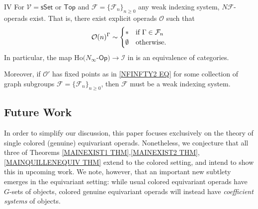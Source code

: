 \documentclass[a4paper,10pt
,draft
]{article}%
\numberwithin{equation}{section}
\numberwithin{figure}{section}
\theoremstyle{definition} %
\newcommand{\Set}{\ensuremath{\mathsf{Set}}}
\newcommand{\sSet}{\ensuremath{\mathsf{sSet}}}%
\newcommand{\Op}{\mathsf{Op}}%
\newcommand{\V}{\ensuremath{\mathcal V}}
\renewcommand{\O}{\ensuremath{\mathcal O}}
\newcommand{\1}{\ensuremath{\mathbbm 1}}%
\begin{document}
\begin{customcor}{IV}\label{NINFTY_REAL_COR_MAIN}
For $\V = \sSet$ or $\mathsf{Top}$ and 
$\mathcal{F} = \{\mathcal{F}_n\}_{n \geq 0}$
any weak indexing system,
$N \mathcal{F}$-operads exist. That is, there exist explicit operads $\O$
such that
\begin{equation}\label{NFINFTY2 EQ}
	\O(n)^{\Gamma} \sim 
\begin{cases}
	\** & \text{if } \Gamma \in \mathcal{F}_n
\\
	\emptyset & \text{otherwise}.
\end{cases}
\end{equation}  
In particular, the map $\mathrm{Ho}(N_\infty$-$\Op) \to \mathcal I$
in \cite[Cor. 5.6]{BH15}
 is an equivalence of categories.
 
 Moreover, if $\mathcal{O}'$ has fixed points as in 
 \eqref{NFINFTY2 EQ} for some collection of graph subgroups 
 $\mathcal{F} = \{\mathcal{F}_n\}_{n \geq 0}$, then 
 $\mathcal{F}$ must be a weak indexing system.
\end{customcor}


\subsection{Future Work}




In order to simplify our discussion,
this paper focuses exclusively on the theory of 
single colored (genuine) equivariant operads.
Nonetheless, we conjecture that all three of 
Theorems \ref{MAINEXIST1 THM},\ref{MAINEXIST2 THM},\ref{MAINQUILLENEQUIV THM}
extend to the colored setting,
and intend to show this in upcoming work.
We note, however, that an important new subtlety emerges in the 
equivariant setting:
while usual colored equivariant operads have $G$-sets of objects,
colored genuine equivariant operads will instead have \textit{coefficient systems} of objects.
\end{document}

